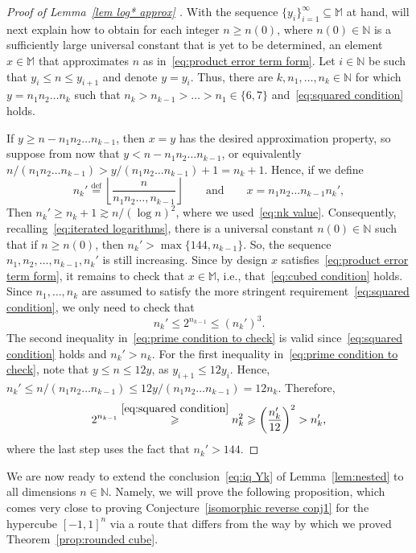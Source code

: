 \documentclass[11pt,reqno]{amsart}
\renewcommand{\le}{\leqslant}
\renewcommand{\ge}{\geqslant}
\theoremstyle{remark}
\renewcommand{\subset}{\subseteq}
\newcommand{\N}{\mathbb N}
\newcommand{\eqdef}{\stackrel{\mathrm{def}}{=}}
\renewcommand{\1}{\mathbf 1}
\begin{document}
\begin{proof}[Proof of Lemma~\ref{lem log* approx} ]
With the sequence $\{y_i\}_{i=1}^\infty\subset \mathbb{M}$ at hand, will next explain how to obtain for each integer $n\ge n(0)$, where $n(0)\in \N$ is a sufficiently large universal constant that is yet to be determined, an element $x\in \mathbb{M}$ that approximates $n$ as in~\eqref{eq:product error term form}. Let $i\in \N$ be such that $y_i\le n\le y_{i+1}$ and denote $y=y_i$. Thus, there are $k,n_1,\ldots,n_k\in \N$ for which $y=n_1n_2\ldots n_k$ such that $n_k>n_{k-1}>\ldots> n_1\in \{6,7\}$ and~\eqref{eq:squared condition} holds.


 If $y\ge n-n_1n_2\ldots n_{k-1}$, then $x=y$ has the desired approximation property, so suppose from now that $y<n-n_1n_2\ldots n_{k-1}$, or equivalently $n/(n_1n_2\ldots n_{k-1})> y/(n_1n_2\ldots n_{k-1})+1=n_k+1$. Hence, if we define
\begin{equation}\label{eq:def nk'}
n_k'\eqdef \left\lfloor \frac{n}{n_1n_2\ldots,n_{k-1}}\right\rfloor\qquad \mathrm{and}\qquad x=n_1n_2\ldots n_{k-1} n_k',
\end{equation}
Then $n_k'\ge n_k+1\gtrsim n/(\log n)^2$, where we used~\eqref{eq:nk value}. Consequently, recalling~\eqref{eq:iterated logarithms}, there is a universal constant $n(0)\in \N$ such that if $n\ge n(0)$, then $n_k'>\max\{144,n_{k-1}\}$. So, the sequence $n_1,n_2,\ldots,n_{k-1},n_k'$ is still increasing. Since by design $x$ satisfies~\eqref{eq:product error term form}, it remains to check that $x\in \mathbb{M}$, i.e., that~\eqref{eq:cubed condition} holds. Since $n_1,\ldots,n_k$ are assumed to satisfy the more stringent requirement~\eqref{eq:squared condition}, we only need to check that
\begin{equation}\label{eq:prime condition to check}
n_{k}'\le 2^{n_{k-1}}\le (n_{k}')^3.
\end{equation}
The second inequality in~\eqref{eq:prime condition to check} is valid since~\eqref{eq:squared condition} holds and $n_k'>n_k$. For the first inequality in~\eqref{eq:prime condition to check}, note that $y\le n\le 12 y$, as  $y_{i+1}\le 12 y_i$. Hence, $n_k'\le n/(n_1n_2\ldots n_{k-1})\le 12y/(n_1n_2\ldots n_{k-1})= 12n_k$. Therefore,
$$
2^{n_{k-1}}\stackrel{\eqref{eq:squared condition}}{\ge} n_k^2\ge \bigg(\frac{n_k'}{12}\bigg)^2>n_k',
$$
where the last step uses the fact that $n_k'>144$.
\end{proof}


We are now ready to extend the conclusion~\eqref{eq:iq Yk} of Lemma~\ref{lem:nested} to all dimensions $n\in \N$. Namely, we will prove the following proposition, which comes very close to proving Conjecture~\ref{isomorphic reverse conj1} for the hypercube $[-1,1]^n$ via a route that differs from the way by which we proved Theorem~\ref{prop:rounded cube}.
\end{document}
